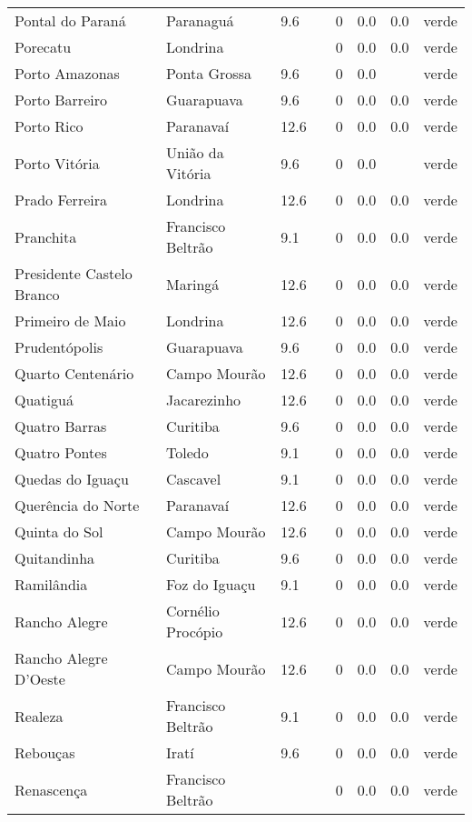 \begin{longtable}{l|lllllll}
  Pontal do Paraná & Paranaguá & 9.6 &  & 0 & 0.0 & 0.0 & verde \\ 
  Porecatu & Londrina &  &  & 0 & 0.0 & 0.0 & verde \\ 
  Porto Amazonas & Ponta Grossa & 9.6 &  & 0 & 0.0 &  & verde \\ 
  Porto Barreiro & Guarapuava & 9.6 &  & 0 & 0.0 & 0.0 & verde \\ 
  Porto Rico & Paranavaí & 12.6 &  & 0 & 0.0 & 0.0 & verde \\ 
  Porto Vitória & União da Vitória & 9.6 &  & 0 & 0.0 &  & verde \\ 
  Prado Ferreira & Londrina & 12.6 &  & 0 & 0.0 & 0.0 & verde \\ 
  Pranchita & Francisco Beltrão & 9.1 &  & 0 & 0.0 & 0.0 & verde \\ 
  Presidente Castelo Branco & Maringá & 12.6 &  & 0 & 0.0 & 0.0 & verde \\ 
  Primeiro de Maio & Londrina & 12.6 &  & 0 & 0.0 & 0.0 & verde \\ 
  Prudentópolis & Guarapuava & 9.6 &  & 0 & 0.0 & 0.0 & verde \\ 
  Quarto Centenário & Campo Mourão & 12.6 &  & 0 & 0.0 & 0.0 & verde \\ 
  Quatiguá & Jacarezinho & 12.6 &  & 0 & 0.0 & 0.0 & verde \\ 
  Quatro Barras & Curitiba & 9.6 &  & 0 & 0.0 & 0.0 & verde \\ 
  Quatro Pontes & Toledo & 9.1 &  & 0 & 0.0 & 0.0 & verde \\ 
  Quedas do Iguaçu & Cascavel & 9.1 &  & 0 & 0.0 & 0.0 & verde \\ 
  Querência do Norte & Paranavaí & 12.6 &  & 0 & 0.0 & 0.0 & verde \\ 
  Quinta do Sol & Campo Mourão & 12.6 &  & 0 & 0.0 & 0.0 & verde \\ 
  Quitandinha & Curitiba & 9.6 &  & 0 & 0.0 & 0.0 & verde \\ 
  Ramilândia & Foz do Iguaçu & 9.1 &  & 0 & 0.0 & 0.0 & verde \\ 
  Rancho Alegre & Cornélio Procópio & 12.6 &  & 0 & 0.0 & 0.0 & verde \\ 
  Rancho Alegre D'Oeste & Campo Mourão & 12.6 &  & 0 & 0.0 & 0.0 & verde \\ 
  Realeza & Francisco Beltrão & 9.1 &  & 0 & 0.0 & 0.0 & verde \\ 
  Rebouças & Iratí & 9.6 &  & 0 & 0.0 & 0.0 & verde \\ 
  Renascença & Francisco Beltrão &  &  & 0 & 0.0 & 0.0 & verde \\ 

\end{longtable}
